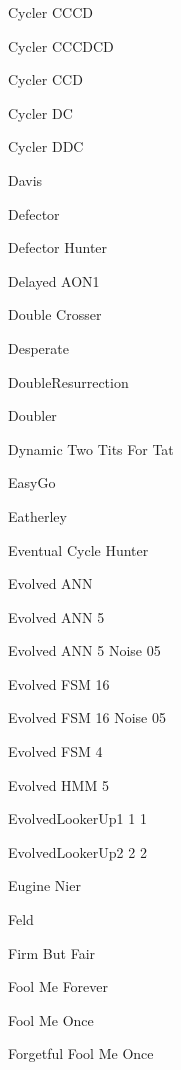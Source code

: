 \item Cycler CCCD~\cite{axelrodproject}
\item Cycler CCCDCD~\cite{axelrodproject}
\item Cycler CCD~\cite{Mittal2009}
\item Cycler DC~\cite{axelrodproject}
\item Cycler DDC~\cite{Mittal2009}
\item Davis~\cite{Axelrod1980a}
\item Defector~\cite{Axelrod1981, Mittal2009, Press2012}
\item Defector Hunter~\cite{axelrodproject}
\item Delayed AON1~\cite{Hilbe2017}
\item Double Crosser~\cite{axelrodproject}
\item Desperate~\cite{Van2015}
\item DoubleResurrection~\cite{Eckhart2015}
\item Doubler~\cite{prison}
\item Dynamic Two Tits For Tat~\cite{axelrodproject}
\item EasyGo~\cite{Li2011, prison}
\item Eatherley~\cite{Axelrod1980b}
\item Eventual Cycle Hunter~\cite{axelrodproject}
\item Evolved ANN~\cite{axelrodproject}
\item Evolved ANN 5~\cite{axelrodproject}
\item Evolved ANN 5 Noise 05~\cite{axelrodproject}
\item Evolved FSM 16~\cite{axelrodproject}
\item Evolved FSM 16 Noise 05~\cite{axelrodproject}
\item Evolved FSM 4~\cite{axelrodproject}
\item Evolved HMM 5~\cite{axelrodproject}
\item EvolvedLookerUp1 1 1~\cite{axelrodproject}
\item EvolvedLookerUp2 2 2~\cite{axelrodproject}
\item Eugine Nier~\cite{lesswrong}
\item Feld~\cite{Axelrod1980a}
\item Firm But Fair~\cite{Frean1994}
\item Fool Me Forever~\cite{axelrodproject}
\item Fool Me Once~\cite{axelrodproject}
\item Forgetful Fool Me Once~\cite{axelrodproject}
